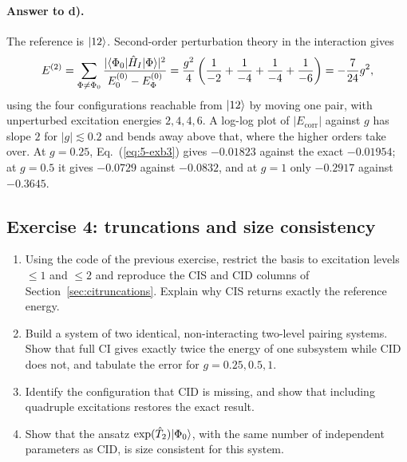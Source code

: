 \paragraph{Answer to d).}
The reference is $\vert 12 \rangle$.  Second-order perturbation theory in the
interaction gives
\begin{equation}
  E^{(2)} = \sum_{\Phi\ne\Phi_0}
    \frac{|\langle \Phi_0 | \hat{H}_I | \Phi \rangle|^2}{E_0^{(0)}-E_{\Phi}^{(0)}}
  = \frac{g^2}{4}\left(\frac{1}{-2}+\frac{1}{-4}+\frac{1}{-4}
    +\frac{1}{-6}\right)
  = -\frac{7}{24}g^2 ,
  \label{eq:5-exb3}
\end{equation}
using the four configurations reachable from $\vert 12 \rangle$ by moving one pair,
with unperturbed excitation energies $2,4,4,6$.  A log-log plot of
$|E_{\mathrm{corr}}|$ against $g$ has slope $2$ for $|g|\lesssim0.2$ and bends
away above that, where the higher orders take over.  At $g=0.25$,
Eq.~(\ref{eq:5-exb3}) gives $-0.01823$ against the exact $-0.01954$; at
$g=0.5$ it gives $-0.0729$ against $-0.0832$, and at $g=1$ only $-0.2917$
against $-0.3645$.

\subsection*{Exercise 4: truncations and size consistency}
\label{ex:5-sizeconsistency}

\begin{enumerate}
  \item[a)] Using the code of the previous exercise, restrict the basis to
  excitation levels $\le1$ and $\le2$ and reproduce the CIS and CID columns of
  Section~\ref{sec:citruncations}.  Explain why CIS returns exactly the
  reference energy.
  \item[b)] Build a system of two identical, non-interacting two-level pairing
  systems.  Show that full CI gives exactly twice the energy of one subsystem
  while CID does not, and tabulate the error for $g=0.25,0.5,1$.
  \item[c)] Identify the configuration that CID is missing, and show that
  including quadruple excitations restores the exact result.
  \item[d)] Show that the ansatz $\exp(\hat{T}_2)\vert \Phi_0 \rangle$, with the same
  number of independent parameters as CID, is size consistent for this system.
\end{enumerate}

